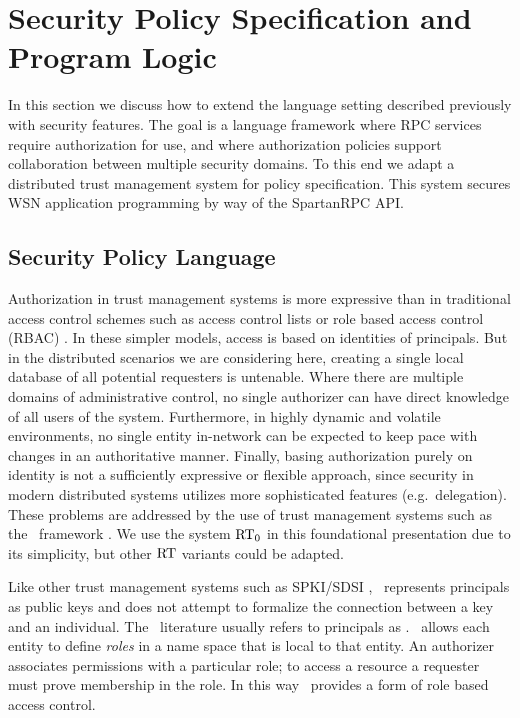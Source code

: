 \section{Security Policy Specification and Program Logic}
\label{section-security-extensions}

In this section we discuss how to extend the language setting described
previously with security features. The goal is a language framework
where RPC services require authorization for use, and where
authorization policies support collaboration between multiple security
domains. To this end we adapt a distributed trust management system
\cite{chapin-skalka-wang-acmcs08} for policy specification. This system
secures WSN application programming by way of the SpartanRPC API.

\subsection{Security Policy Language}

Authorization in trust management systems is more expressive than in
traditional access control schemes such as access control lists or role
based access control (RBAC) \cite{Sandhu:RBACM}. In these simpler
models, access is based on identities of principals. But in the
distributed scenarios we are considering here, creating a single local
database of all potential requesters is untenable. Where there are
multiple domains of administrative control, no single authorizer can
have direct knowledge of all users of the system. Furthermore, in highly
dynamic and volatile environments, no single entity in-network can be
expected to keep pace with changes in an authoritative manner. Finally,
basing authorization purely on identity is not a sufficiently expressive
or flexible approach, since security in modern distributed systems
utilizes more sophisticated features (e.g.~delegation). These problems
are addressed by the use of trust management systems such as the \RT\
framework \cite{Li:DRBTMF}. We use the system $\RT_0$ in this
foundational presentation due to its simplicity, but other $\RT$
variants \cite{Li:DCDTM,Li:RRBTMF} could be adapted.

Like other trust management systems such as SPKI/SDSI \cite{RFC-2693},
\RT\ represents principals as public keys and does not attempt to
formalize the connection between a key and an individual. The \RT\
literature usually refers to principals as . \RT\
allows each entity to define \emph{roles} in a name space that is local
to that entity. An authorizer associates permissions with a particular
role; to access a resource a requester must prove membership in the
role. In this way \RT\ provides a form of role based access control.

